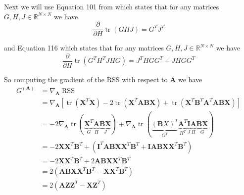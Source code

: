 \documentclass[oneside]{article}
\begin{document}
Next we will use Equation 101 from \textcite{petersenMatrixCookbook2012} which states that for any matrices $G, H, J \in \mathbb{R}^{N \times N}$ we have\begin{equation}
    \label{eq:cookbook_101}
    \frac{\partial}{\partial H}\operatorname{tr}(GHJ) = G^T J^T
\end{equation}

and Equation 116 which states that for any matrices $G, H, J \in \mathbb{R}^{N \times N}$ we have
\begin{equation}
    \label{eq:cookbook_116}
    \frac{\partial}{\partial H}\operatorname{tr}(G^T H^T J H G) = J^T H G G^T + J H G G^T
\end{equation}

So computing the gradient of the RSS with respect to $\mathbf{A}$ we have
\begin{equation}
    \label{eq:gradA}
    \begin{aligned}
        G^{(\mathbf{A})} &= \nabla_\mathbf{A} \operatorname{RSS} \\
        &=\nabla_\mathbf{A} \left[ \operatorname{tr}(\mathbf{X}^T \mathbf{X}) - 2 \operatorname{tr}(\mathbf{X}^T \mathbf{A} \mathbf{B} \mathbf{X}) + \operatorname{tr}(\mathbf{X}^T \mathbf{B}^T \mathbf{A}^T \mathbf{A} \mathbf{B} \mathbf{X}) \right] \\
        &= - 2 \nabla_\mathbf{A} \operatorname{tr}(\underbrace{\mathbf{X}^T}_{G} \underbrace{\mathbf{A}}_{H} \underbrace{\mathbf{B} \mathbf{X}}_{J}) + \nabla_\mathbf{A} \operatorname{tr}(\underbrace{(\mathbf{B} X)^T}_{G^T} \underbrace{\mathbf{A}^T}_{H^T} \underbrace{\mathbf{I}}_{J} \underbrace{\mathbf{A}}_{H} \underbrace{\mathbf{B} \mathbf{X}}_{G}) \\
        &= - 2 \mathbf{X} \mathbf{X}^T \mathbf{B}^T + \left( \mathbf{I}^T \mathbf{A} \mathbf{B} \mathbf{X} \mathbf{X}^T \mathbf{B}^T + \mathbf{I} \mathbf{A} \mathbf{B} \mathbf{X} \mathbf{X}^T \mathbf{B}^T \right) \\
        &= - 2 \mathbf{X} \mathbf{X}^T \mathbf{B}^T + 2 \mathbf{A} \mathbf{B} \mathbf{X} \mathbf{X}^T \mathbf{B}^T \\
        &= 2 \left( \mathbf{A} \mathbf{B} \mathbf{X} \mathbf{X}^T \mathbf{B}^T - \mathbf{X} \mathbf{X}^T \mathbf{B}^T \right) \\
        &= 2 \left( \mathbf{A} \mathbf{Z} \mathbf{Z}^T - \mathbf{X} \mathbf{Z}^T \right)
    \end{aligned}
\end{equation}
\end{document}
